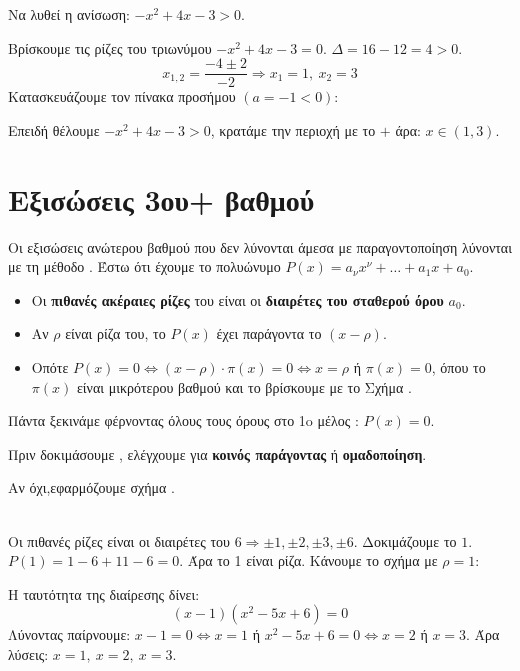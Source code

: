 Να λυθεί η ανίσωση: $-x^2 + 4x - 3 > 0$.

\lysh
Βρίσκουμε τις ρίζες του τριωνύμου $-x^2 + 4x - 3 = 0$. $\Delta = 16 - 12 = 4 > 0$.
\[ x_{1,2} = \dfrac{-4 \pm 2}{-2} \Rightarrow x_1 = 1,\ x_2 = 3 \]
Κατασκευάζουμε τον πίνακα προσήμου $(a = -1 < 0)$:
\begin{center}
\end{center}
Επειδή θέλουμε $-x^2 + 4x - 3> 0$, κρατάμε την περιοχή με το $+$ άρα: $x \in (1, 3)$.

\section{Εξισώσεις 3ου+ βαθμού}

Οι εξισώσεις ανώτερου βαθμού που δεν λύνονται άμεσα με παραγοντοποίηση λύνονται με τη μέθοδο \textbf{}.
Έστω ότι έχουμε το πολυώνυμο $P(x) = a_\nu x^\nu + \dots + a_1 x + a_0$.
\begin{itemize}
    \item Οι \textbf{πιθανές ακέραιες ρίζες} του είναι οι \textbf{διαιρέτες του σταθερού όρου} $a_0$.
    \item Αν $\rho$ είναι ρίζα του, το $P(x)$ έχει παράγοντα το $(x - \rho)$. 
    \item Οπότε $P(x) = 0 \Leftrightarrow (x - \rho) \cdot \pi(x) = 0 \Leftrightarrow x = \rho$ ή $\pi(x) = 0$, όπου το $\pi(x)$ είναι μικρότερου βαθμού και το βρίσκουμε με το Σχήμα .
\end{itemize}

\bhmata
\begin{bhma}
    \item Πάντα ξεκινάμε φέρνοντας όλους τους όρους στο 1o μέλος : $P(x) = 0$.
    \item Πριν δοκιμάσουμε , ελέγχουμε για \textbf{κοινός παράγοντας} ή \textbf{ομαδοποίηση}.
	\item Αν όχι,εφαρμόζουμε σχήμα .
\end{bhma}


\\
\lysh
Οι πιθανές ρίζες είναι οι διαιρέτες του $ 6 \Rightarrow \pm 1, \pm 2, \pm 3, \pm 6$. 
Δοκιμάζουμε το $1$.  $P(1) = 1 - 6 + 11 - 6 = 0$. Άρα το 1 είναι ρίζα.
Κάνουμε το σχήμα  με $\rho = 1$:
\begin{center}
\end{center}
Η ταυτότητα της διαίρεσης δίνει:
\[ (x - 1)(x^2 - 5x + 6) = 0 \]
Λύνοντας παίρνουμε: $x - 1 = 0 \Leftrightarrow x = 1$ ή $x^2 - 5x + 6 = 0 \Leftrightarrow x = 2$ ή $x = 3$.
Άρα λύσεις: $x = 1, \ x=2,\ x= 3$.

